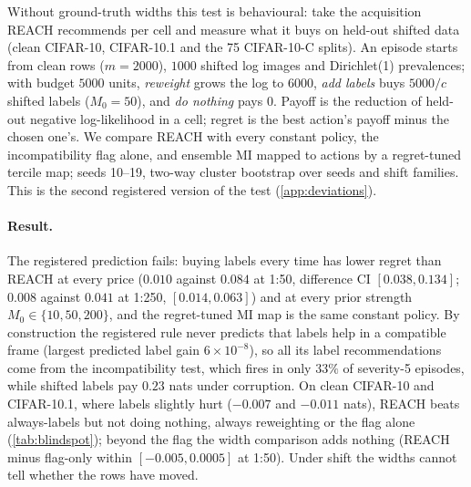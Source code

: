 Without ground-truth widths this test is behavioural: take the acquisition REACH recommends per cell and
measure what it buys on held-out shifted data (clean CIFAR-10, CIFAR-10.1 \citep{recht2018cifar} and the 75
CIFAR-10-C splits). An episode starts from clean rows ($m=2000$), $1000$ shifted log images and Dirichlet(1)
prevalences; with budget $5000$ units, \emph{reweight} grows the log to $6000$, \emph{add labels} buys $5000/c$
shifted labels ($M_0=50$), and \emph{do nothing} pays $0$. Payoff is the reduction of held-out negative
log-likelihood in a cell; regret is the best action's payoff minus the chosen one's. We compare REACH with every
constant policy, the incompatibility flag alone, and ensemble MI mapped to actions by a regret-tuned tercile map;
seeds 10--19, two-way cluster bootstrap over seeds and shift families. This is the second registered version of
the test (\cref{app:deviations}).

\begin{table}[t]
\centering\small
\caption{Mean regret (nats per cell) by policy. Left: price 1:50 by shift family; right: all 77
splits at prices 1:50 and 1:250. Evaluation seeds; prior strength $M_0=50$.}
\label{tab:blindspot}
\setlength{\tabcolsep}{3pt}
\resizebox{\columnwidth}{!}{}
\end{table}

\paragraph{Result.} The registered prediction fails: buying labels every time has lower regret than
REACH at every price ($0.010$ against $0.084$ at 1:50, difference CI $[0.038,0.134]$; $0.008$ against
$0.041$ at 1:250, $[0.014,0.063]$) and at every prior strength $M_0\in\{10,50,200\}$, and the regret-tuned
MI map is the same constant policy. By construction the registered rule never predicts that labels help in a compatible frame (largest
predicted label gain $6\times10^{-8}$), so all its label recommendations come from the incompatibility test,
which fires in only $33\%$ of severity-5 episodes, while shifted labels pay $0.23$ nats under corruption. On clean CIFAR-10 and
CIFAR-10.1, where labels slightly hurt ($-0.007$ and $-0.011$ nats), REACH beats always-labels but not
doing nothing, always reweighting or the flag alone (\cref{tab:blindspot}); beyond the flag the width
comparison adds nothing (REACH minus flag-only within $[-0.005,0.0005]$ at 1:50). Under shift the widths
cannot tell whether the rows have moved.

